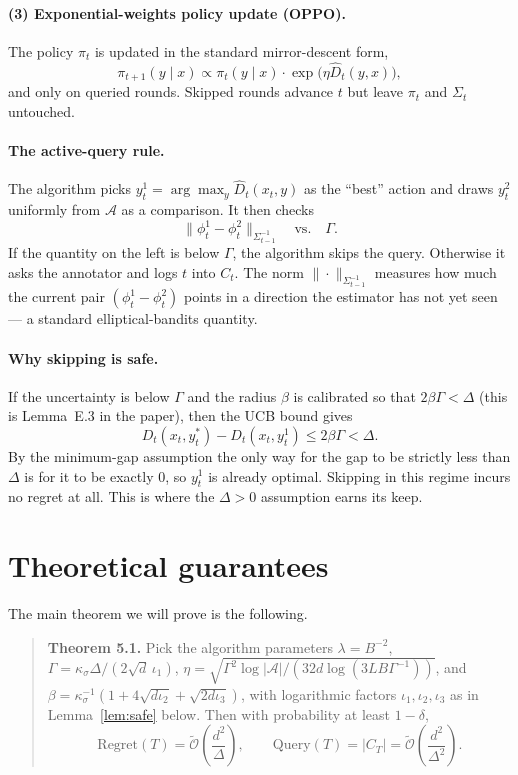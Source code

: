 \documentclass[11pt]{article}
\newcommand{\Otilde}{\tilde{\mathcal{O}}}
\begin{document}
\paragraph{(3) Exponential-weights policy update (OPPO).}
The policy $\pi_t$ is updated in the standard mirror-descent form,
\[
  \pi_{t+1}(y \mid x) \propto \pi_t(y \mid x) \cdot \exp\!\bigl( \eta \hat D_t(y, x) \bigr),
\]
and only on queried rounds. Skipped rounds advance $t$ but leave $\pi_t$ and $\Sigma_t$ untouched.

\paragraph{The active-query rule.}
The algorithm picks $y_t^1 = \arg\max_y \hat D_t(x_t, y)$ as the ``best'' action and draws $y_t^2$ uniformly from $\mathcal{A}$ as a comparison. It then checks
\[
  \|\phi_t^1 - \phi_t^2\|_{\Sigma_{t-1}^{-1}}
  \quad \text{vs.} \quad
  \Gamma.
\]
If the quantity on the left is below $\Gamma$, the algorithm skips the query. Otherwise it asks the annotator and logs $t$ into $C_t$. The norm $\|\cdot\|_{\Sigma_{t-1}^{-1}}$ measures how much the current pair $(\phi_t^1 - \phi_t^2)$ points in a direction the estimator has not yet seen --- a standard elliptical-bandits quantity.

\paragraph{Why skipping is safe.}
If the uncertainty is below $\Gamma$ and the radius $\beta$ is calibrated so that $2 \beta \Gamma < \Delta$ (this is Lemma~E.3 in the paper), then the UCB bound gives
\[
  D_t(x_t, y_t^*) - D_t(x_t, y_t^1) \le 2\beta\Gamma < \Delta.
\]
By the minimum-gap assumption the only way for the gap to be strictly less than $\Delta$ is for it to be exactly $0$, so $y_t^1$ is already optimal. Skipping in this regime incurs no regret at all. This is where the $\Delta > 0$ assumption earns its keep.

\section{Theoretical guarantees}
\label{sec:theory}

The main theorem we will prove is the following.

\begin{quote}
\textbf{Theorem 5.1.} Pick the algorithm parameters $\lambda = B^{-2}$, $\Gamma = \kappa_\sigma \Delta / (2 \sqrt{d}\, \iota_1)$, $\eta = \sqrt{\Gamma^2 \log|\mathcal{A}| / (32 d \log(3LB\Gamma^{-1}))}$, and $\beta = \kappa_\sigma^{-1}(1 + 4\sqrt{d \iota_2} + \sqrt{2 d \iota_3})$, with logarithmic factors $\iota_1, \iota_2, \iota_3$ as in Lemma~\ref{lem:safe} below. Then with probability at least $1 - \delta$,
\[
  \mathrm{Regret}(T) = \Otilde\!\left(\frac{d^2}{\Delta}\right),
  \qquad
  \mathrm{Query}(T) = |C_T| = \Otilde\!\left(\frac{d^2}{\Delta^2}\right).
\]
\end{quote}
\end{document}
